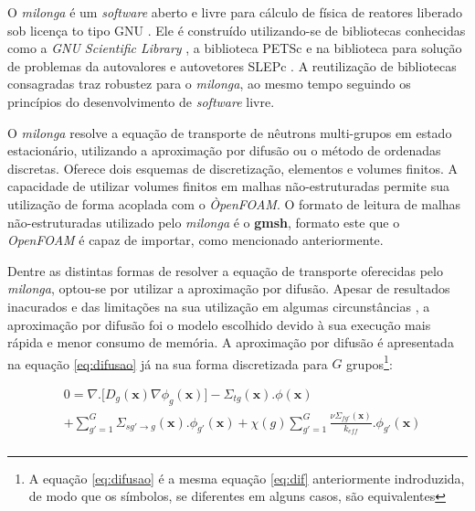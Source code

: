 O \textit{milonga} é um \textit{software} aberto e livre para cálculo de física de reatores
liberado sob licença to tipo GNU \cite{gplv3}. Ele é construído utilizando-se de bibliotecas
conhecidas como a \textit{GNU Scientific Library} \cite{Galassi2009}, a biblioteca
PETSc \cite{Balay2016} e na biblioteca para solução de problemas da autovalores e autovetores
SLEPc \cite{Hernandez2005}. A reutilização de bibliotecas consagradas traz robustez para
o \textit{milonga}, ao mesmo tempo seguindo os princípios do desenvolvimento de \textit{software} livre.

O \textit{milonga} resolve a equação de transporte de nêutrons multi-grupos em estado estacionário,
utilizando a aproximação por difusão ou o método de ordenadas discretas. Oferece dois esquemas
de discretização, elementos e volumes finitos. A capacidade de utilizar volumes finitos em malhas
não-estruturadas permite sua utilização de forma acoplada com o \textit{ÒpenFOAM}. O formato
de leitura de malhas não-estruturadas utilizado pelo \textit{milonga} é o \textbf{gmsh}, formato
este que o \textit{OpenFOAM} é capaz de importar, como mencionado anteriormente.

Dentre as distintas formas de resolver a equação de transporte oferecidas pelo \textit{milonga},
optou-se por utilizar a aproximação por difusão. Apesar de resultados inacurados e das limitações
na sua utilização em algumas circunstâncias \cite{Trahan2014}, a aproximação por difusão
foi o modelo escolhido devido à sua execução mais rápida e menor consumo de memória.
A aproximação por difusão é apresentada na equação \ref{eq:difusao} já na sua forma discretizada
para $G$ grupos\footnote{A equação \ref{eq:difusao} é a mesma equação \ref{eq:dif} anteriormente
  indroduzida, de modo
  que os símbolos, se diferentes em alguns casos, são equivalentes}:

\begin{equation}
  \label{eq:difusao}
  \begin{split}
  & 0 = \nabla . \big[D_g({\mathbf{x}}) \nabla \phi_g(\mathbf{x})\big] 
- \Sigma_{tg}(\mathbf{x}).\phi(\mathbf{x}) \\
& + \sum_{g'=1}^{G} \Sigma_{sg'\rightarrow g}(\mathbf{x}) . \phi_{g'}(\mathbf{x})
+ \chi(g)  \sum_{g'=1}^{G} \frac{\nu \Sigma_{fg'}(\mathbf{x})}{k_{eff}} . \phi_{g'}(\mathbf{x}) \\
  \end{split}
  \end{equation}



